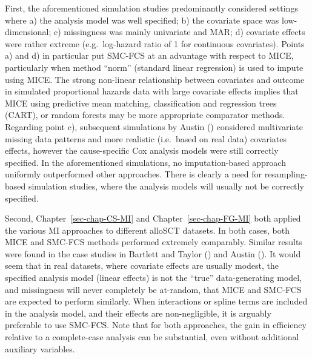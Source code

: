 \documentclass[
  letterpaper,
  DIV=11,
  numbers=noendperiod]{scrreprt}
\begin{document}
First, the aforementioned simulation studies predominantly considered
settings where a) the analysis model was well specified; b) the
covariate space was low-dimensional; c) missingness was mainly
univariate and MAR; d) covariate effects were rather extreme
(e.g.~log-hazard ratio of 1 for continuous covariates). Points a) and d)
in particular put SMC-FCS at an advantage with respect to MICE,
particularly when method ``norm'' (standard linear regression) is used
to impute using MICE. The strong non-linear relationship between
covariates and outcome in simulated proportional hazards data with large
covariate effects implies that MICE using predictive mean matching,
classification and regression trees (CART), or random forests may be
more appropriate comparator methods. Regarding point c), subsequent
simulations by Austin
() considered
multivariate missing data patterns and more realistic (i.e.~based on
real data) covariates effects, however the cause-specific Cox analysis
models were still correctly specified. In the aforementioned
simulations, no imputation-based approach uniformly outperformed other
approaches. There is clearly a need for resampling-based simulation
studies, where the analysis models will usually not be correctly
specified.

Second, Chapter~\ref{sec-chap-CS-MI} and Chapter~\ref{sec-chap-FG-MI}
both applied the various MI approaches to different alloSCT datasets. In
both cases, both MICE and SMC-FCS methods performed extremely
comparably. Similar results were found in the case studies in Bartlett
and Taylor ()
and Austin ().
It would seem that in real datasets, where covariate effects are usually
modest, the specified analysis model (linear effects) is not the
``true'' data-generating model, and missingness will never completely be
at-random, that MICE and SMC-FCS are expected to perform similarly. When
interactions or spline terms are included in the analysis model, and
their effects are non-negligible, it is arguably preferable to use
SMC-FCS. Note that for both approaches, the gain in efficiency relative
to a complete-case analysis can be substantial, even without additional
auxiliary variables.
\end{document}
